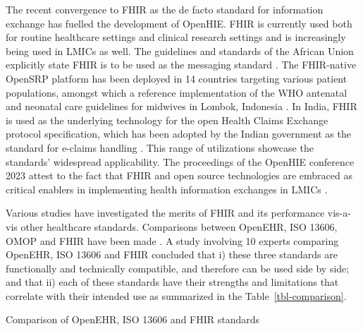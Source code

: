 \documentclass[
  authoryear]{elsarticle}
\begin{document}
The recent convergence to FHIR as the de facto standard for information
exchange has fuelled the development of OpenHIE. FHIR is currently used
both for routine healthcare settings
\citep{amar2024electronic, ayaz2021fast} and clinical research settings
\citep{duda2022hl7, vorisek2022fast} and is increasingly being used in
LMICs as well. The guidelines and standards of the African Union
explicitly state FHIR is to be used as the messaging standard
\citep{2023african}. The FHIR-native OpenSRP platform
\citep{mehl2020open} has been deployed in 14 countries targeting various
patient populations, amongst which a reference implementation of the WHO
antenatal and neonatal care guidelines for midwives in Lombok, Indonesia
\citep{summitinstitutefordevelopment2023bunda, kurniawan2019midwife}. In
India, FHIR is used as the underlying technology for the open Health
Claims Exchange protocol specification, which has been adopted by the
Indian government as the standard for e-claims handling \citep{hcx}.
This range of utilizations showcase the standards' widespread
applicability. The proceedings of the OpenHIE conference 2023 attest to
the fact that FHIR and open source technologies are embraced as critical
enablers in implementing health information exchanges in LMICs
\citep{ohie2023unconference}.

Various studies have investigated the merits of FHIR and its performance
vis-a-vis other healthcare standards. Comparisons between OpenEHR, ISO
13606, OMOP and FHIR have been made
\citep{ayaz2023transforming, mullie2023coda, rinaldi2021openehr, cremonesi2023need, sinaci2023data, tsafnat2024converge}.
A study involving 10 experts comparing OpenEHR, ISO 13606 and FHIR
concluded that i) these three standards are functionally and technically
compatible, and therefore can be used side by side; and that ii) each of
these standards have their strengths and limitations that correlate with
their intended use as summarized in the Table~\ref{tbl-comparison}.

\begin{table}

\caption{\label{tbl-comparison}Comparison of OpenEHR, ISO 13606 and FHIR
standards}


\end{table}%
\end{document}
